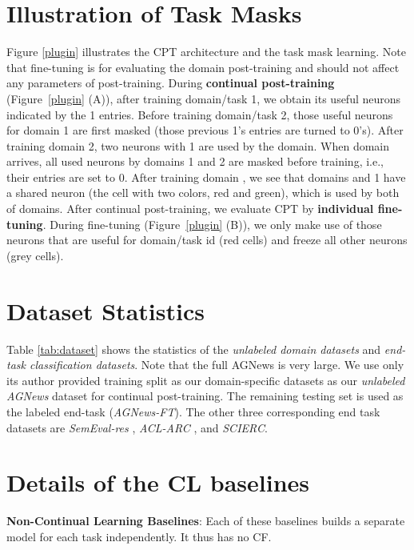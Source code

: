 \documentclass[11pt]{article}
\begin{document}
\section{Illustration of Task Masks}
\label{sec.illustration}
Figure \ref{plugin} illustrates the CPT architecture and the task mask learning. Note that fine-tuning is for evaluating the domain post-training and should not affect any parameters of post-training. 
During \textbf{continual post-training} (Figure~\ref{plugin} (A)), after training domain/task 1, we obtain its useful neurons indicated by the 1 entries. Before training domain/task 2, those useful neurons for domain 1 are first masked (those previous 1's entries are turned to 0's). After training domain 2, two neurons with 1 are used by the domain. When domain  arrives, all used neurons by domains 1 and 2 are masked before training, i.e., their entries are set to 0. After training domain , we see that domains  and 1 have a shared neuron (the cell with two colors, red and green), which is used by both of domains. After continual post-training, we evaluate CPT by \textbf{individual fine-tuning}. During fine-tuning (Figure~\ref{plugin} (B)), we only make use of those neurons that are useful for domain/task id  (red cells) and freeze all other neurons (grey cells).

\section{Dataset Statistics}
\label{sec:data_stat}


Table \ref{tab:dataset} shows the statistics of the \textit{unlabeled domain datasets} and \textit{end-task classification datasets}.
Note that the full AGNews is very large. We use only its author provided training split as our domain-specific datasets as our \textit{unlabeled AGNews} dataset for continual post-training. The remaining testing set is used as the labeled end-task (\textit{AGNews-FT}). The other three corresponding end task datasets are \textit{SemEval-res} \cite{DBLP:conf/naacl/XuLSY19}, \textit{ACL-ARC} \cite{DBLP:journals/tacl/JurgensKHMJ18}, and \textit{SCIERC}\cite{DBLP:conf/emnlp/LuanHOH18}. 



\section{Details of the CL baselines}
\label{ap:baselines}



\textbf{Non-Continual Learning Baselines}: Each of these baselines builds a separate model for each
task independently.
It thus has no CF. 
\end{document}
